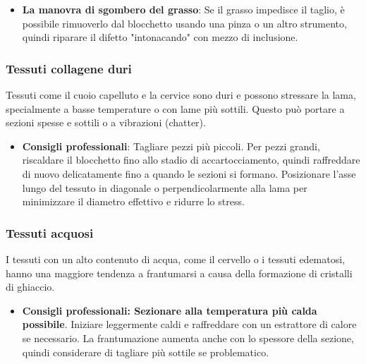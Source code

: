 \begin{itemize}
\begin{itemize}
        \item   \textbf{La manovra di sgombero del grasso}: Se il grasso impedisce il taglio, è possibile rimuoverlo dal blocchetto usando una pinza o un altro strumento, quindi riparare il difetto "intonacando" con mezzo di inclusione. 
    \end{itemize}
\end{itemize}

\subsubsection{Tessuti collagene duri}
Tessuti come il cuoio capelluto e la cervice sono duri e possono stressare la lama, specialmente a basse temperature o con lame più sottili.  Questo può portare a sezioni spesse e sottili o a vibrazioni (chatter).
\begin{itemize}
    \item   \textbf{Consigli professionali}: Tagliare pezzi più piccoli.  Per pezzi grandi, riscaldare il blocchetto fino allo stadio di accartocciamento, quindi raffreddare di nuovo delicatamente fino a quando le sezioni si formano.  Posizionare l'asse lungo del tessuto in diagonale o perpendicolarmente alla lama per minimizzare il diametro effettivo e ridurre lo stress. 
\end{itemize}

\subsubsection{Tessuti acquosi}
I tessuti con un alto contenuto di acqua, come il cervello o i tessuti edematosi, hanno una maggiore tendenza a frantumarsi a causa della formazione di cristalli di ghiaccio. 
\begin{itemize}
    \item   \textbf{Consigli professionali\textbf{: Sezionare alla }temperatura più calda possibile}.  Iniziare leggermente caldi e raffreddare con un estrattore di calore se necessario.  La frantumazione aumenta anche con lo spessore della sezione, quindi considerare di tagliare più sottile se problematico. 
\end{itemize}

